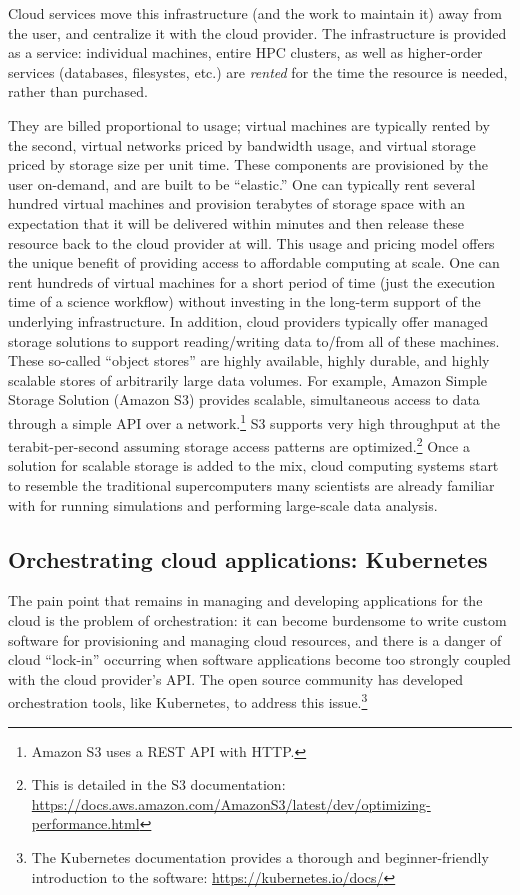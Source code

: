 \documentclass[twocolumn, linenumbers]{aastex631}
\begin{document}
Cloud services move this infrastructure (and the work to maintain it) away from the user, and centralize it with the cloud provider. The infrastructure is provided as a service: individual machines, entire HPC clusters, as well as higher-order services (databases, filesystes, etc.) are {\em rented} for the time the resource is needed, rather than purchased.

They are billed proportional to usage; virtual machines are typically rented by the second, virtual networks priced by bandwidth usage, and virtual storage priced by storage size per unit time. These components are provisioned by the user on-demand, and are built to be ``elastic.'' One can typically rent several hundred virtual machines and provision terabytes of storage space with an expectation that it will be delivered within minutes and then release these resource back to the cloud provider at will. This usage and pricing model offers the unique benefit of providing access to affordable computing at scale. One can rent hundreds of virtual machines for a short period of time (just the execution time of a science workflow) without investing in the long-term support of the underlying infrastructure. In addition, cloud providers typically offer managed storage solutions to support reading/writing data to/from all of these machines. These so-called ``object stores'' are highly available, highly durable, and highly scalable stores of arbitrarily large data volumes. For example, Amazon Simple Storage Solution (Amazon S3) provides scalable, simultaneous access to data through a simple API over a network.\footnote{Amazon S3 uses a REST API with HTTP.} S3 supports very high throughput at the terabit-per-second assuming storage access patterns are optimized.\footnote{This is detailed in the S3 documentation: \url{https://docs.aws.amazon.com/AmazonS3/latest/dev/optimizing-performance.html}} Once a solution for scalable storage is added to the mix, cloud computing systems start to resemble the traditional supercomputers many scientists are already familiar with for running simulations and performing large-scale data analysis.

\subsection{Orchestrating cloud applications: Kubernetes}

The pain point that remains in managing and developing applications for the cloud is the problem of orchestration: it can become burdensome to write custom software for provisioning and managing cloud resources, and there is a danger of cloud ``lock-in'' occurring when software applications become too strongly coupled with the cloud provider's API. The open source community has developed orchestration tools, like Kubernetes, to address this issue.\footnote{The Kubernetes documentation provides a thorough and beginner-friendly introduction to the software: \url{https://kubernetes.io/docs/}}
\end{document}
